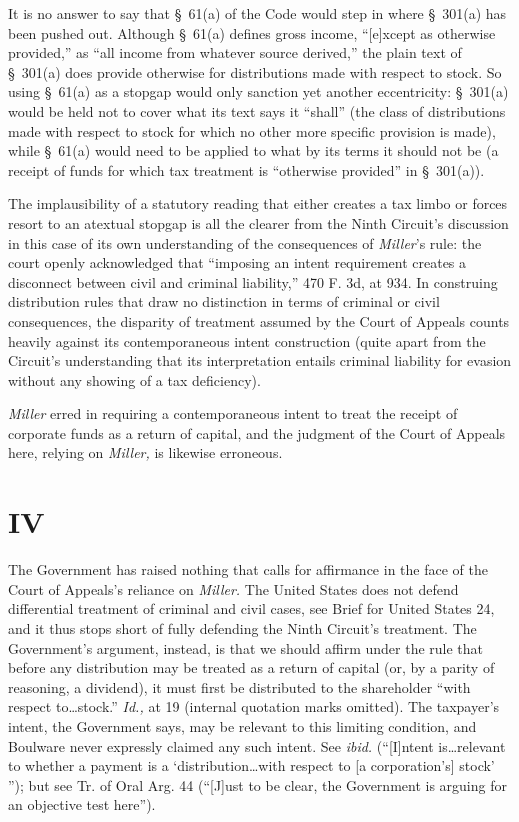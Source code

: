   It is no answer to say that \S~61(a) of the Code would step in where
\S~301(a) has been pushed out. Although \S~61(a) defines gross income,
``[e]xcept as otherwise provided,'' as ``all income from whatever
source derived,'' the plain text of \S~301(a) does provide otherwise
for distributions made with respect to stock. So using \S~61(a) as a
stopgap would only sanction yet another eccentricity: \S~301(a) would
be held not to cover what its text says it ``shall'' (the class of
distribu\newpage  tions made with respect to stock for which no other more
specific provision is made), while \S~61(a) would need to be applied
to what by its terms it should not be (a receipt of funds for which tax
treatment is ``otherwise provided'' in \S~301(a)).


  The implausibility of a statutory reading that either creates
a tax limbo or forces resort to an atextual stopgap is all the
clearer from the Ninth Circuit's discussion in this case of its
own understanding of the consequences of \emph{Miller}'s rule: the
court openly acknowledged that ``imposing an intent requirement
creates a disconnect between civil and criminal liability,'' 470
F. 3d, at 934. In construing distribution rules that draw no
distinction in terms of criminal or civil consequences, the disparity
of treatment assumed by the Court of Appeals counts heavily against its
contemporaneous intent construction (quite apart from the Circuit's
understanding that its interpretation entails criminal liability for
evasion without any showing of a tax deficiency).

  \emph{Miller} erred in requiring a contemporaneous intent to treat the
receipt of corporate funds as a return of capital, and the judgment of
the Court of Appeals here, relying on \emph{Miller,} is likewise erroneous.

\section{IV}

  The Government has raised nothing that calls for affirmance in the
face of the Court of Appeals's reliance on \emph{Miller.} The United
States does not defend differential treatment of criminal and civil
cases, see Brief for United States 24, and it thus stops short of
fully defending the Ninth Circuit's treatment. The Government's
argument, instead, is that we should affirm under the rule that before
any distribution may be treated as a return of capital (or, by a
parity of reasoning, a dividend), it must first be distributed to
the shareholder ``with respect to\dots stock.'' \emph{Id.,} at
19 (internal quotation marks omitted). The taxpayer's intent,
the Government says, may be relevant to this limiting condition,
and Boul\newpage ware never expressly claimed any such intent. See
\emph{ibid.} (``[I]ntent is\dots relevant to whether a payment is a
‘distribution\dots with respect to [a corporation's] stock'
''); but see Tr. of Oral Arg. 44 (``[J]ust to be clear, the Government
is arguing for an objective test here'').

